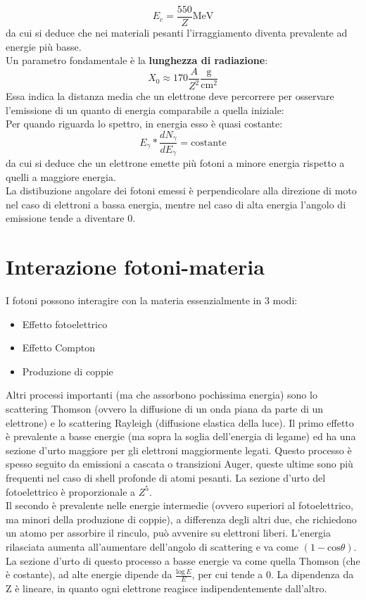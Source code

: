 \begin{equation*}
E_c = \frac{550}{Z} \text{MeV}
\end{equation*}
da cui si deduce che nei materiali pesanti l'irraggiamento diventa prevalente ad energie pi\`u basse.\\
Un parametro fondamentale \`e la \textbf{lunghezza di radiazione}:
\begin{equation*}
X_0 \approx 170 \frac{A}{Z^2} \frac{\text{g}}{\text{cm}^2}
\end{equation*}
Essa indica la distanza media che un elettrone deve percorrere per osservare l'emissione di un quanto di energia comparabile a quella iniziale:\\
Per quando riguarda lo spettro, in energia esso \`e quasi costante:
\begin{equation*}
E_{\gamma} * \frac{dN_{\gamma}}{dE_{\gamma}} = \text{costante}
\end{equation*}
da cui si deduce che un elettrone emette pi\`u fotoni a minore energia rispetto a quelli a maggiore energia.\\
La distibuzione angolare dei fotoni emessi \`e perpendicolare alla direzione di moto nel caso di elettroni a bassa energia,
mentre nel caso di alta energia l'angolo di emissione tende a diventare 0.

\section{Interazione fotoni-materia}
I fotoni possono interagire con la materia essenzialmente in 3 modi:
\begin{itemize}
\item Effetto fotoelettrico
\item Effetto Compton
\item Produzione di coppie
\end{itemize}
Altri processi importanti (ma che assorbono pochissima energia) sono lo scattering Thomson (ovvero la diffusione di un onda piana da parte di un elettrone) e
lo scattering Rayleigh (diffusione elastica della luce).
Il primo effetto \`e prevalente a basse energie (ma sopra la soglia dell'energia di legame) ed ha una sezione d'urto maggiore per gli elettroni maggiormente legati.
Questo processo \`e spesso seguito da emissioni a cascata o transizioni Auger, queste ultime sono pi\`u frequenti nel caso di shell profonde di atomi pesanti.
La sezione d'urto del fotoelettrico \`e proporzionale a $Z^5$.\\
Il secondo \`e prevalente nelle energie intermedie (ovvero superiori al fotoelettrico, ma minori della produzione di coppie), a differenza degli altri due, che richiedono un atomo per assorbire il rinculo,
pu\`o avvenire su elettroni liberi. 
L'energia rilasciata aumenta all'aumentare dell'angolo di scattering e va come $(1-\text{cos} \theta)$.
La sezione d'urto di questo processo a basse energie va come quella Thomson (che \`e costante), ad alte energie dipende da $\frac{\text{log}\, E}{E}$,
per cui tende a 0. La dipendenza da Z \`e lineare, in quanto ogni elettrone reagisce indipendentemente dall'altro.\\
